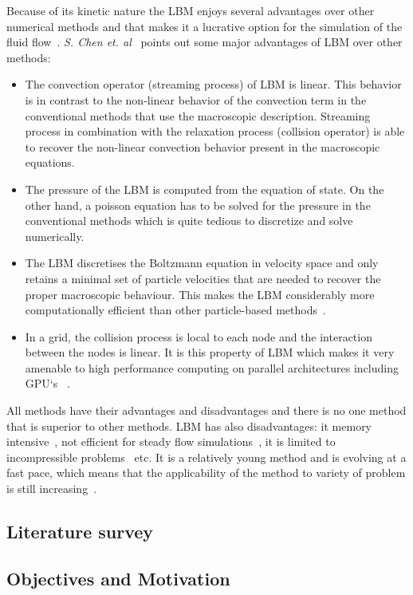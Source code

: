 Because of its kinetic nature the LBM enjoys several advantages over other numerical methods and that makes it a lucrative option for the simulation of the fluid flow~\cite{doolen}. \emph{S. Chen et. al}~\cite{doolen} points out some major advantages of LBM over other methods:

\begin{itemize}
\item The convection operator (streaming process) of LBM is linear. This behavior is in contrast to the non-linear behavior of the convection term in the conventional methods that use the macroscopic description. Streaming process in combination with the relaxation process (collision operator) is able to recover the non-linear convection behavior present in the macroscopic equations.

\item The pressure of the LBM is computed from the equation of state. On the other hand, a poisson equation has to be solved for the pressure in the conventional methods which is quite tedious to discretize and solve numerically.

\item The LBM discretises the Boltzmann equation in velocity space and only retains a minimal set of particle velocities that are needed to recover the proper macroscopic behaviour. This makes the LBM considerably more computationally efficient than other particle-based methods~\cite{thesis:bespalko}.

\item In a grid, the collision process is local to each node and the interaction between the nodes is linear. It is this property of LBM which makes it very amenable to high performance computing on parallel architectures including GPU`s ~\cite{krueger:book}.
\end{itemize}

All methods have their advantages and disadvantages and there is no one method that is superior to other methods. LBM has also disadvantages: it memory intensive~\cite{krueger:book}, not efficient for steady flow simulations~\cite{geller}, it is limited to incompressible problems~\cite{thesis:bespalko} etc. It is a relatively young method and is evolving at a fast pace, which means that the applicability of the method to variety of problem is still increasing~\cite{krueger:book}.


\subsection{Literature survey}


\subsection{Objectives and Motivation}
